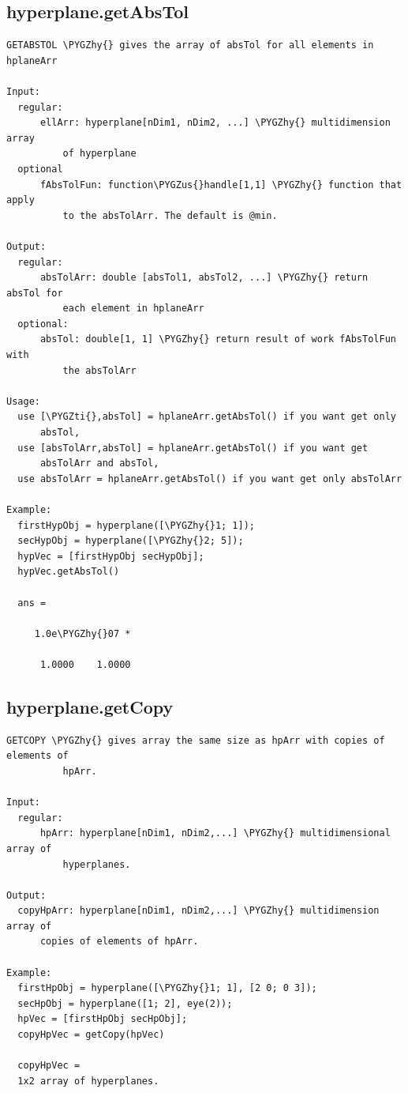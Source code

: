 \documentclass[letterpaper,10pt,english]{sphinxmanual}
\def\PYGZus{\char`\_}
\def\PYGZhy{\char`\-}
\def\PYGZti{\char`\~}
\begin{document}
\subsection{hyperplane.getAbsTol}
\label{chap_functions:hyperplane-getabstol}
\begin{Verbatim}[commandchars=\\\{\}]
GETABSTOL \PYGZhy{} gives the array of absTol for all elements in hplaneArr

Input:
  regular:
      ellArr: hyperplane[nDim1, nDim2, ...] \PYGZhy{} multidimension array
          of hyperplane
  optional
      fAbsTolFun: function\PYGZus{}handle[1,1] \PYGZhy{} function that apply
          to the absTolArr. The default is @min.

Output:
  regular:
      absTolArr: double [absTol1, absTol2, ...] \PYGZhy{} return absTol for
          each element in hplaneArr
  optional:
      absTol: double[1, 1] \PYGZhy{} return result of work fAbsTolFun with
          the absTolArr

Usage:
  use [\PYGZti{},absTol] = hplaneArr.getAbsTol() if you want get only
      absTol,
  use [absTolArr,absTol] = hplaneArr.getAbsTol() if you want get
      absTolArr and absTol,
  use absTolArr = hplaneArr.getAbsTol() if you want get only absTolArr

Example:
  firstHypObj = hyperplane([\PYGZhy{}1; 1]);
  secHypObj = hyperplane([\PYGZhy{}2; 5]);
  hypVec = [firstHypObj secHypObj];
  hypVec.getAbsTol()

  ans =

     1.0e\PYGZhy{}07 *

      1.0000    1.0000
\end{Verbatim}


\subsection{hyperplane.getCopy}
\label{chap_functions:hyperplane-getcopy}
\begin{Verbatim}[commandchars=\\\{\}]
GETCOPY \PYGZhy{} gives array the same size as hpArr with copies of elements of
          hpArr.

Input:
  regular:
      hpArr: hyperplane[nDim1, nDim2,...] \PYGZhy{} multidimensional array of
          hyperplanes.

Output:
  copyHpArr: hyperplane[nDim1, nDim2,...] \PYGZhy{} multidimension array of
      copies of elements of hpArr.

Example:
  firstHpObj = hyperplane([\PYGZhy{}1; 1], [2 0; 0 3]);
  secHpObj = hyperplane([1; 2], eye(2));
  hpVec = [firstHpObj secHpObj];
  copyHpVec = getCopy(hpVec)

  copyHpVec =
  1x2 array of hyperplanes.
\end{Verbatim}
\end{document}
